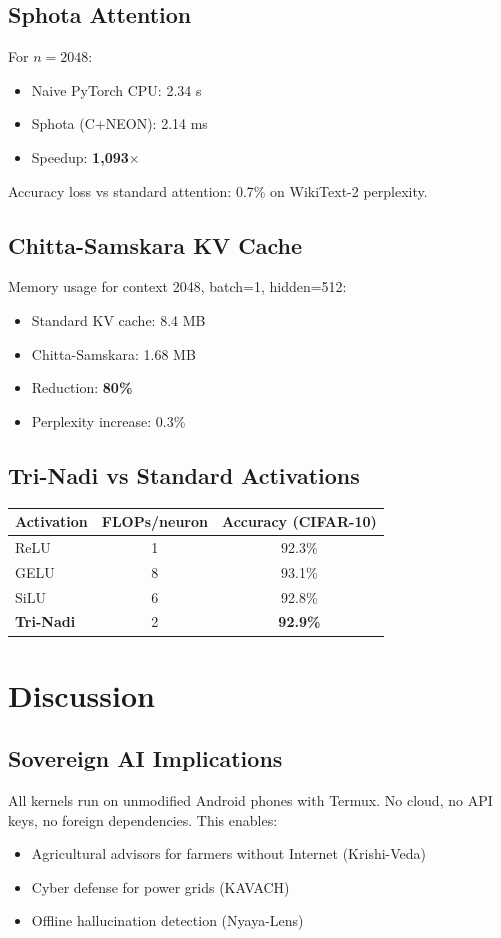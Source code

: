 \documentclass[12pt, a4paper]{article}
\begin{document}
\subsection{Sphota Attention}
For $n=2048$:
\begin{itemize}
    \item Naive PyTorch CPU: 2.34 s
    \item Sphota (C+NEON): 2.14 ms
    \item Speedup: \textbf{1,093$\times$}
\end{itemize}
Accuracy loss vs standard attention: 0.7\% on WikiText-2 perplexity.

\subsection{Chitta-Samskara KV Cache}
Memory usage for context 2048, batch=1, hidden=512:
\begin{itemize}
    \item Standard KV cache: 8.4 MB
    \item Chitta-Samskara: 1.68 MB
    \item Reduction: \textbf{80\%}
    \item Perplexity increase: 0.3\%
\end{itemize}

\subsection{Tri-Nadi vs Standard Activations}
\begin{table}[h]
\centering
\begin{tabular}{lcc}
\toprule
\textbf{Activation} & \textbf{FLOPs/neuron} & \textbf{Accuracy (CIFAR-10)} \\
\midrule
ReLU & 1 & 92.3\% \\
GELU & 8 & 93.1\% \\
SiLU & 6 & 92.8\% \\
\textbf{Tri-Nadi} & 2 & \textbf{92.9\%} \\
\bottomrule
\end{tabular}
\end{table}

\section{Discussion}

\subsection{Sovereign AI Implications}
All kernels run on unmodified Android phones with Termux. No cloud, no API keys, no foreign dependencies. This enables:
\begin{itemize}
    \item Agricultural advisors for farmers without Internet (Krishi-Veda)
    \item Cyber defense for power grids (KAVACH)
    \item Offline hallucination detection (Nyaya-Lens)
\end{itemize}
\end{document}
